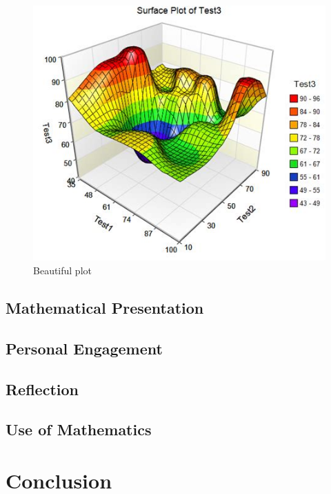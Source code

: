 \documentclass[11pt]{article}
\begin{document}
\begin{figure}[H]
    \centering
    \includegraphics[scale=0.5]{plot1}
    \caption{Beautiful plot}
    \label{fig:img1}
\end{figure}



\subsection{Mathematical Presentation}

\subsection{Personal Engagement}

\subsection{Reflection}

\subsection{Use of Mathematics}

\section{Conclusion}
\end{document}
